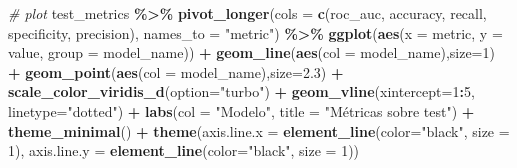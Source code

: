 \documentclass[12pt,a4paper,]{book}
\newenvironment{Shaded}{\begin{snugshade}}{\end{snugshade}}
\newcommand{\AttributeTok}[1]{\textcolor[rgb]{0.13,0.29,0.53}{#1}}
\newcommand{\CommentTok}[1]{\textcolor[rgb]{0.56,0.35,0.01}{\textit{#1}}}
\newcommand{\DecValTok}[1]{\textcolor[rgb]{0.00,0.00,0.81}{#1}}
\newcommand{\FloatTok}[1]{\textcolor[rgb]{0.00,0.00,0.81}{#1}}
\newcommand{\FunctionTok}[1]{\textcolor[rgb]{0.13,0.29,0.53}{\textbf{#1}}}
\newcommand{\NormalTok}[1]{#1}
\newcommand{\SpecialCharTok}[1]{\textcolor[rgb]{0.81,0.36,0.00}{\textbf{#1}}}
\newcommand{\StringTok}[1]{\textcolor[rgb]{0.31,0.60,0.02}{#1}}
\numberwithin{dummy}{section}
\theoremstyle{ocrenumbox}
\theoremstyle{blacknumex}
\theoremstyle{blacknumbox}
\theoremstyle{ocrenum}
\theoremstyle{ocrenum}
\begin{document}
\begin{Shaded}
\begin{Highlighting}[]
\CommentTok{\# plot}
\NormalTok{test\_metrics }\SpecialCharTok{\%\textgreater{}\%} 
  \FunctionTok{pivot\_longer}\NormalTok{(}\AttributeTok{cols =} \FunctionTok{c}\NormalTok{(roc\_auc, accuracy, recall, specificity, precision),}
               \AttributeTok{names\_to =} \StringTok{"metric"}\NormalTok{) }\SpecialCharTok{\%\textgreater{}\%} 
  \FunctionTok{ggplot}\NormalTok{(}\FunctionTok{aes}\NormalTok{(}\AttributeTok{x =}\NormalTok{ metric, }\AttributeTok{y =}\NormalTok{ value, }\AttributeTok{group =}\NormalTok{ model\_name)) }\SpecialCharTok{+}
  \FunctionTok{geom\_line}\NormalTok{(}\FunctionTok{aes}\NormalTok{(}\AttributeTok{col =}\NormalTok{ model\_name),}\AttributeTok{size=}\DecValTok{1}\NormalTok{) }\SpecialCharTok{+}
  \FunctionTok{geom\_point}\NormalTok{(}\FunctionTok{aes}\NormalTok{(}\AttributeTok{col =}\NormalTok{ model\_name),}\AttributeTok{size=}\FloatTok{2.3}\NormalTok{) }\SpecialCharTok{+}
  \FunctionTok{scale\_color\_viridis\_d}\NormalTok{(}\AttributeTok{option=}\StringTok{"turbo"}\NormalTok{) }\SpecialCharTok{+}
  \FunctionTok{geom\_vline}\NormalTok{(}\AttributeTok{xintercept=}\DecValTok{1}\SpecialCharTok{:}\DecValTok{5}\NormalTok{, }\AttributeTok{linetype=}\StringTok{"dotted"}\NormalTok{) }\SpecialCharTok{+}
  \FunctionTok{labs}\NormalTok{(}\AttributeTok{col =} \StringTok{"Modelo"}\NormalTok{, }\AttributeTok{title =} \StringTok{"Métricas sobre test"}\NormalTok{) }\SpecialCharTok{+}
  \FunctionTok{theme\_minimal}\NormalTok{() }\SpecialCharTok{+}
  \FunctionTok{theme}\NormalTok{(}\AttributeTok{axis.line.x =} \FunctionTok{element\_line}\NormalTok{(}\AttributeTok{color=}\StringTok{"black"}\NormalTok{, }\AttributeTok{size =} \DecValTok{1}\NormalTok{),}
        \AttributeTok{axis.line.y =} \FunctionTok{element\_line}\NormalTok{(}\AttributeTok{color=}\StringTok{"black"}\NormalTok{, }\AttributeTok{size =} \DecValTok{1}\NormalTok{))}
  

\end{Highlighting}
\end{Shaded}
\end{document}
